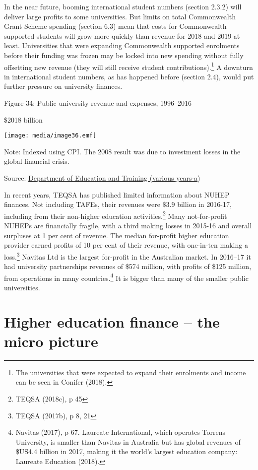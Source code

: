 \documentclass[]{book}
\begin{document}
In the near future, booming international student numbers (section 2.3.2) will deliver large profits to some universities. But limits on total Commonwealth Grant Scheme spending (section 6.3) mean that costs for Commonwealth supported students will grow more quickly than revenue for 2018 and 2019 at least. Universities that were expanding Commonwealth supported enrolments before their funding was frozen may be locked into new spending without fully offsetting new revenue (they will still receive student contributions).\footnote{The universities that were expected to expand their enrolments and income can be seen in Conifer (2018).} A downturn in international student numbers, as has happened before (section 2.4), would put further pressure on university finances.

\protect\hypertarget{_Ref457650501}{}{}Figure 34: Public university revenue and expenses, 1996--2016

\$2018 billion

\texttt{[image: media/image36.emf]}

Note: Indexed using CPI. The 2008 result was due to investment losses in the global financial crisis.

Source: \protect\hyperlink{_ENREF_88}{Department of Education and Training (various years-a})

In recent years, TEQSA has published limited information about NUHEP finances. Not including TAFEs, their revenues were \$3.9 billion in 2016-17, including from their non-higher education activities.\footnote{TEQSA (2018c), p 45} Many not-for-profit NUHEPs are financially fragile, with a third making losses in 2015-16 and overall surpluses at 1 per cent of revenue. The median for-profit higher education provider earned profits of 10 per cent of their revenue, with one-in-ten making a loss.\footnote{TEQSA (2017b), p 8, 21} Navitas Ltd is the largest for-profit in the Australian market. In 2016--17 it had university partnerships revenues of \$574 million, with profits of \$125 million, from operations in many countries.\footnote{Navitas (2017), p 67. Laureate International, which operates Torrens University, is smaller than Navitas in Australia but has global revenues of \$US4.4 billion in 2017, making it the world's largest education company: Laureate Education (2018).} It is bigger than many of the smaller public universities.

\hypertarget{higher-education-finance-the-micro-picture}{%
\chapter{Higher education finance -- the micro picture}\label{higher-education-finance-the-micro-picture}}
\end{document}
